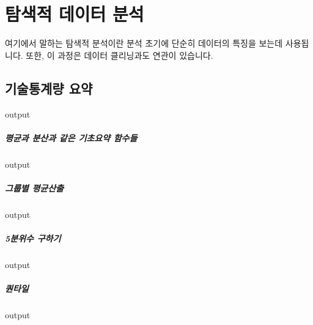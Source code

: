 \documentclass{book}
\begin{document}
%
%
%

\chapter{탐색적 데이터 분석}

여기에서 말하는 탐색적 분석이란 분석 초기에 단순히 데이터의 특징을 보는데 사용됩니다. 
또한, 이 과정은 데이터 클리닝과도 연관이 있습니다. 

\section{기술통계량 요약}
\begin{Schunk}
\begin{Soutput}
output
\end{Soutput}
\end{Schunk}

\paragraph{평균과 분산과 같은 기초요약 함수들}
\begin{Schunk}
\begin{Soutput}
output
\end{Soutput}
\end{Schunk}

\paragraph{그룹별 평균산출}
\begin{Schunk}
\begin{Soutput}
output
\end{Soutput}
\end{Schunk}

\paragraph{5분위수 구하기}
\begin{Schunk}
\begin{Soutput}
output
\end{Soutput}
\end{Schunk}

\paragraph{퀀타일}
\begin{Schunk}
\begin{Soutput}
output
\end{Soutput}
\end{Schunk}
\end{document}
